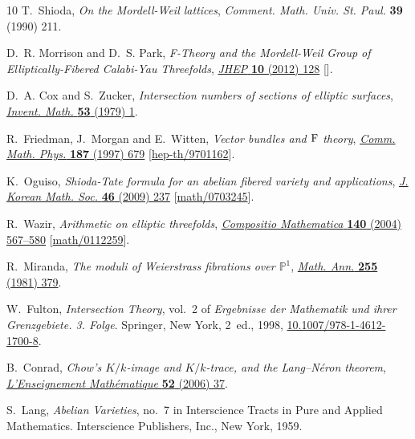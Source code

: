 \documentclass[11pt]{amsart}
\theoremstyle{definition}
\theoremstyle{definition}
\theoremstyle{remark}
\theoremstyle{remark}
\theoremstyle{definition}
\theoremstyle{conjecture}
\begin{document}
\begin{thebibliography}{10}
T.~Shioda, \emph{On the {M}ordell-{W}eil lattices}, {\emph{Comment. Math. Univ.
  St. Paul.} {\bfseries 39} (1990) 211}.

D.~R. Morrison and D.~S. Park, \emph{{F-Theory and the Mordell-Weil Group of
  Elliptically-Fibered Calabi-Yau Threefolds}},
  \href{https://doi.org/10.1007/JHEP10(2012)128}{\emph{JHEP} {\bfseries 10}
  (2012) 128} [\href{https://arxiv.org/abs/1208.2695}{{}}].

D.~A. Cox and S.~Zucker, \emph{Intersection numbers of sections of elliptic
  surfaces}, \href{https://doi.org/10.1007/BF01403189}{\emph{Invent. Math.}
  {\bfseries 53} (1979) 1}.

R.~Friedman, J.~Morgan and E.~Witten, \emph{Vector bundles and {${\rm F}$}
  theory}, \href{https://doi.org/10.1007/s002200050154}{\emph{Comm. Math.
  Phys.} {\bfseries 187} (1997) 679}
  [\href{https://arxiv.org/abs/hep-th/9701162}{{\ttfamily hep-th/9701162}}].

K.~Oguiso, \emph{Shioda-{T}ate formula for an abelian fibered variety and
  applications}, \href{https://doi.org/10.4134/JKMS.2009.46.2.237}{\emph{J.
  Korean Math. Soc.} {\bfseries 46} (2009) 237}
  [\href{https://arxiv.org/abs/math/0703245}{{\ttfamily math/0703245}}].

R.~Wazir, \emph{Arithmetic on elliptic threefolds},
  \href{https://doi.org/10.1112/S0010437X03000381}{\emph{Compositio
  Mathematica} {\bfseries 140} (2004) 567{--}580}
  [\href{https://arxiv.org/abs/math/0112259}{{\ttfamily math/0112259}}].

R.~Miranda, \emph{The moduli of {W}eierstrass fibrations over
  {$\mathbb{P}^1$}}, \href{https://doi.org/10.1007/BF01450711}{\emph{Math.
  Ann.} {\bfseries 255} (1981) 379}.

W.~Fulton, \emph{Intersection Theory}, vol.~2 of \emph{Ergebnisse der
  Mathematik und ihrer Grenzgebiete. 3. Folge}. Springer, New York, 2~ed.,
  1998,
  \href{https://doi.org/10.1007/978-1-4612-1700-8}{10.1007/978-1-4612-1700-8}.

B.~Conrad, \emph{Chow's {$K/k$}-image and {$K/k$}-trace, and the
  {Lang--N{\'e}ron} theorem},
  \href{https://doi.org/10.5169/seals-2226}{\emph{L'Enseignement
  Math{\'e}matique} {\bfseries 52} (2006) 37}.

S.~Lang, \emph{Abelian Varieties}, no.~7 in Interscience Tracts in Pure and
  Applied Mathematics. Interscience Publishers, Inc., New York, 1959.


\end{thebibliography}
\end{document}
